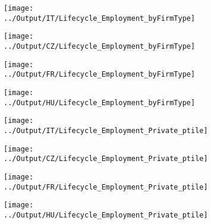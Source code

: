 \documentclass[12pt,notitlepage]{article}
\begin{document}
\begin{figure}[!htpb]
\centering
\caption{Average Employment by Year (Public vs. Private)}
\begin{subfigure}{.49\textwidth}
    \centering
 \texttt{[image: ../Output/IT/Lifecycle\_Employment\_byFirmType]}
\end{subfigure}%
\begin{subfigure}{.49\textwidth}
    \centering
 \texttt{[image: ../Output/CZ/Lifecycle\_Employment\_byFirmType]}
\end{subfigure}
\begin{subfigure}{.49\textwidth}
    \centering
 \texttt{[image: ../Output/FR/Lifecycle\_Employment\_byFirmType]}
\end{subfigure}%
\begin{subfigure}{.49\textwidth}
    \centering
 \texttt{[image: ../Output/HU/Lifecycle\_Employment\_byFirmType]}
\end{subfigure}
\end{figure}
\pagebreak

\begin{figure}[!htpb]
\centering
\caption{Employment Percentiles by Year (Private Firms)}
\begin{subfigure}{.49\textwidth}
    \centering
 \texttt{[image: ../Output/IT/Lifecycle\_Employment\_Private\_ptile]}
\end{subfigure}%
\begin{subfigure}{.49\textwidth}
    \centering
 \texttt{[image: ../Output/CZ/Lifecycle\_Employment\_Private\_ptile]}
\end{subfigure}
\begin{subfigure}{.49\textwidth}
    \centering
 \texttt{[image: ../Output/FR/Lifecycle\_Employment\_Private\_ptile]}
\end{subfigure}%
\begin{subfigure}{.49\textwidth}
    \centering
 \texttt{[image: ../Output/HU/Lifecycle\_Employment\_Private\_ptile]}
\end{subfigure}
\end{figure}
\pagebreak
\end{document}
